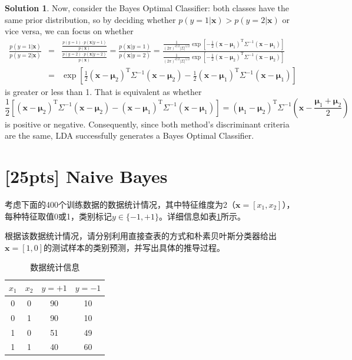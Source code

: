 \documentclass[a4paper,UTF8]{article}
\numberwithin{equation}{section}
\theoremstyle{definition}
\newtheorem*{solution}{Solution}
\begin{document}
\begin{solution}
Now, consider the Bayes Optimal Classifier: both classes have the same prior distribution, so by deciding whether $p(y=1|\bm{x})>p(y=2|\bm{x})$ or vice versa, we can focus on whether
\begin{eqnarray}
\frac{p(y=1|\bm{x})}{p(y=2|\bm{x})}&=&\frac{\frac{p(y=1)\cdot p(\bm{x}|y=1)}{p(\bm{x})}}{\frac{p(y=2)\cdot p(\bm{x}|y=2)}{p(\bm{x})}}=\frac{p(\bm{x}|y=1)}{p(\bm{x}|y=2)}=\frac{\frac{1}{(2\pi)^{d/2}|\Sigma|^{1/2}}\exp[-\frac{1}{2}(\bm{x}-\bm{\mu}_1)^\mathrm{T}\Sigma^{-1}(\bm{x}-\bm{\mu}_1)]}{\frac{1}{(2\pi)^{d/2}|\Sigma|^{1/2}}\exp[-\frac{1}{2}(\bm{x}-\bm{\mu}_2)^\mathrm{T}\Sigma^{-1}(\bm{x}-\bm{\mu}_2)]}\nonumber\\
&=&\exp[\frac{1}{2}(\bm{x}-\bm{\mu}_2)^\mathrm{T}\Sigma^{-1}(\bm{x}-\bm{\mu}_2)-\frac{1}{2}(\bm{x}-\bm{\mu}_1)^\mathrm{T}\Sigma^{-1}(\bm{x}-\bm{\mu}_1)]
\end{eqnarray}
is greater or less than 1. That is equivalent as whether
\begin{equation}
\frac{1}{2}[(\bm{x}-\bm{\mu}_2)^\mathrm{T}\Sigma^{-1}(\bm{x}-\bm{\mu}_2)-(\bm{x}-\bm{\mu}_1)^\mathrm{T}\Sigma^{-1}(\bm{x}-\bm{\mu}_1)]=(\bm{\mu}_1-\bm{\mu}_2)^\mathrm{T}\Sigma^{-1}(\bm{x}-\frac{\bm{\mu}_1+\bm{\mu}_2}{2})
\end{equation}
is positive or negative. Consequently, since both method's discriminant criteria are the same, LDA successfully generates a Bayes Optimal Classifier.
\end{solution}

\section{[25pts] Naive Bayes}
考虑下面的400个训练数据的数据统计情况，其中特征维度为2（$\mathbf{x}=[x_1,x_2]$），每种特征取值0或1，类别标记$y\in\{-1,+1\}$。详细信息如表\ref{table:training}所示。

根据该数据统计情况，请分别利用直接查表的方式和朴素贝叶斯分类器给出$\mathbf{x}=[1,0]$的测试样本的类别预测，并写出具体的推导过程。
\begin{table}[h]
\centering
\caption{数据统计信息}
\label{table:training}\vspace{2mm}
\begin{tabular}{cc|cc}\hline
$x_1$		&  $x_2$ 	&	$y=+1$	&	$y=-1$ 	\\ \hline
0		&  0 	&	90	&	10 \\
0		&  1 	&	90 	&	10 \\
1		&  0 	&	51 	&	49 \\
1		&  1 	&	40 	&	60 \\\hline
\end{tabular}
\end{table}
\end{document}
